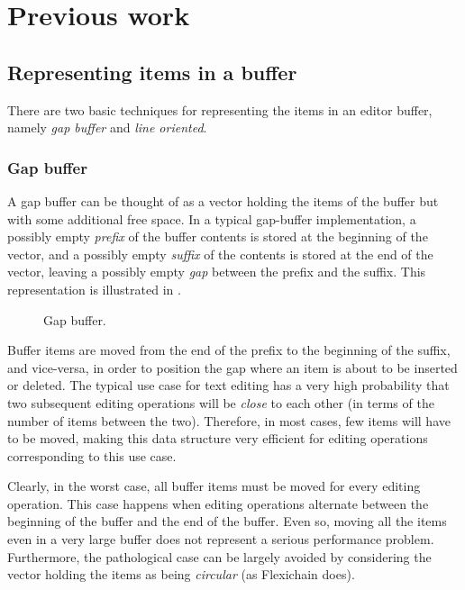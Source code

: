 \section{Previous work}
\label{sec-previous-work}

\subsection{Representing items in a buffer}

There are two basic techniques for representing the items in an editor
buffer, namely \emph{gap buffer} and \emph{line oriented}.

\subsubsection{Gap buffer}
\label{sec-previous-gap-buffer}

A gap buffer can be thought of as a vector holding the items of the
buffer but with some additional free space.  In a typical gap-buffer
implementation, a possibly empty \emph{prefix} of the buffer contents
is stored at the beginning of the vector, and a possibly empty
\emph{suffix} of the contents is stored at the end of the vector,
leaving a possibly empty \emph{gap} between the prefix and the suffix.
This representation is illustrated in .

\begin{figure}
\begin{center}
\end{center}
\caption{\label{fig-gap-buffer}
Gap buffer.}
\end{figure}

Buffer items are moved from the end of the prefix to the beginning of
the suffix, and vice-versa, in order to position the gap where an item
is about to be inserted or deleted.  The typical use case for text
editing has a very high probability that two subsequent editing
operations will be \emph{close} to each other (in terms of the number
of items between the two).  Therefore, in most cases, few
items will have to be moved, making this data structure very
efficient for editing operations corresponding to this use case.

Clearly, in the worst case, all buffer items must be moved for every
editing operation.  This case happens when editing operations
alternate between the beginning of the buffer and the end of the
buffer.  Even so, moving all the items even in a very large buffer
does not represent a serious performance problem.  Furthermore, the
pathological case can be largely avoided by considering the vector
holding the items as being \emph{circular} (as Flexichain
\cite{flexichain} does).

